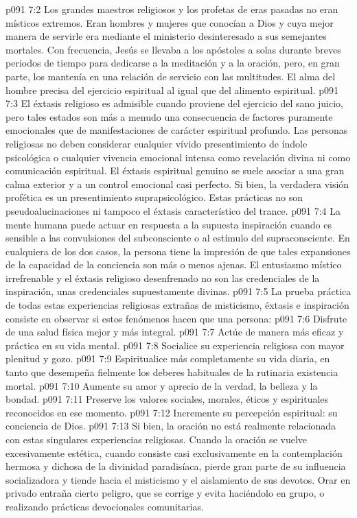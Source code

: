 \vs p091 7:2 Los grandes maestros religiosos y los profetas de eras pasadas no eran místicos extremos. Eran hombres y mujeres que conocían a Dios y cuya mejor manera de servirle era mediante el ministerio desinteresado a sus semejantes mortales. Con frecuencia, Jesús se llevaba a los apóstoles a solas durante breves periodos de tiempo para dedicarse a la meditación y a la oración, pero, en gran parte, los mantenía en una relación de servicio con las multitudes. El alma del hombre precisa del ejercicio espiritual al igual que del alimento espiritual.
\vs p091 7:3 El éxtasis religioso es admisible cuando proviene del ejercicio del sano juicio, pero tales estados son más a menudo una consecuencia de factores puramente emocionales que de manifestaciones de carácter espiritual profundo. Las personas religiosas no deben considerar cualquier vívido presentimiento de índole psicológica o cualquier vivencia emocional intensa como revelación divina ni como comunicación espiritual. El éxtasis espiritual genuino se suele asociar a una gran calma exterior y a un control emocional casi perfecto. Si bien, la verdadera visión profética es un presentimiento suprapsicológico. Estas prácticas no son pseudoalucinaciones ni tampoco el éxtasis característico del trance.
\vs p091 7:4 La mente humana puede actuar en respuesta a la supuesta inspiración cuando es sensible a las convulsiones del subconsciente o al estímulo del supraconsciente. En cualquiera de los dos casos, la persona tiene la impresión de que tales expansiones de la capacidad de la conciencia son más o menos ajenas. El entusiasmo místico irrefrenable y el éxtasis religioso desenfrenado no son las credenciales de la inspiración, unas credenciales supuestamente divinas.
\vs p091 7:5 La prueba práctica de todas estas experiencias religiosas extrañas de misticismo, éxtasis e inspiración consiste en observar si estos fenómenos hacen que una persona:
\vs p091 7:6 Disfrute de una salud física mejor y más integral.
\vs p091 7:7 Actúe de manera más eficaz y práctica en su vida mental.
\vs p091 7:8 Socialice su experiencia religiosa con mayor plenitud y gozo.
\vs p091 7:9 Espiritualice más completamente su vida diaria, en tanto que desempeña fielmente los deberes habituales de la rutinaria existencia mortal.
\vs p091 7:10 Aumente su amor y aprecio de la verdad, la belleza y la bondad.
\vs p091 7:11 Preserve los valores sociales, morales, éticos y espirituales reconocidos en ese momento.
\vs p091 7:12 Incremente su percepción espiritual: su conciencia de Dios.
\vs p091 7:13 \pc Si bien, la oración no está realmente relacionada con estas singulares experiencias religiosas. Cuando la oración se vuelve excesivamente estética, cuando consiste casi exclusivamente en la contemplación hermosa y dichosa de la divinidad paradisíaca, pierde gran parte de su influencia socializadora y tiende hacia el misticismo y el aislamiento de sus devotos. Orar en privado entraña cierto peligro, que se corrige y evita haciéndolo en grupo, o realizando prácticas devocionales comunitarias.
